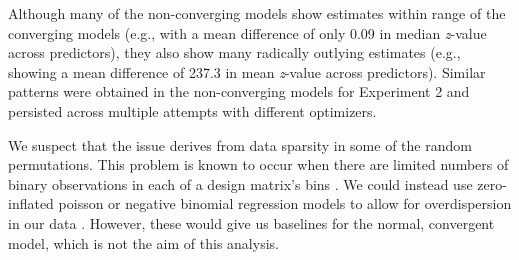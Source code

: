 \documentclass[authoryear, 12pt]{elsarticle}
\begin{document}
Although many of the non-converging models show estimates within range of the converging models (e.g., with a mean difference of only 0.09 in median \textit{z}-value across predictors), they also show many radically outlying estimates (e.g., showing a mean difference of 237.3 in mean \textit{z}-value across predictors). Similar patterns were obtained in the non-converging models for Experiment 2 and persisted across multiple attempts with different optimizers.

We suspect that the issue derives from data sparsity in some of the random permutations. This problem is known to occur when there are limited numbers of binary observations in each of a design matrix's bins \citep{allison2004}. We could instead use zero-inflated poisson or negative binomial regression models to allow for overdispersion in our data \citep{allison2012}. However, these would give us baselines for the normal, convergent model, which is not the aim of this analysis.
\end{document}
